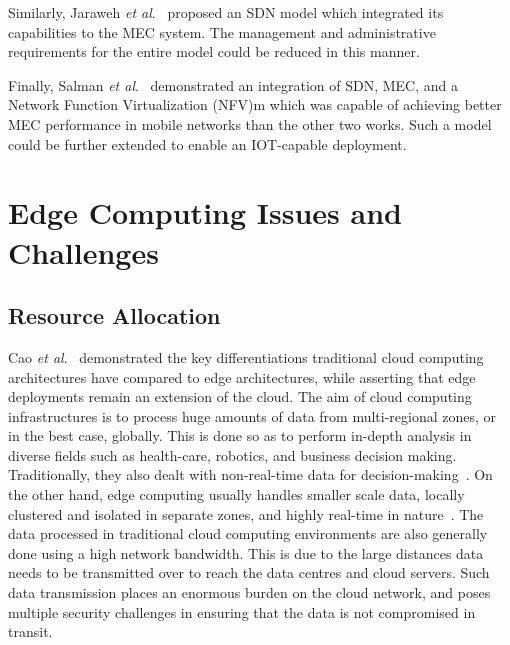 Similarly, Jaraweh \textit{et al}.~\cite{jararweh2016sdmec} proposed an SDN model which integrated its capabilities to the MEC system. The management and administrative requirements for the entire model could be reduced in this manner.\par

Finally, Salman \textit{et al}.~\cite{salman2015edge} demonstrated an integration of SDN, MEC, and a Network Function Virtualization (NFV)m which was capable of achieving better MEC performance in mobile networks than the other two works. Such a model could be further extended to enable an IOT-capable deployment.\par

\section{Edge Computing Issues and Challenges}
\label{sec:ch3-edge-issues}

\subsection{Resource Allocation}
\label{subsec:ch3-edge-resource-alloc}

Cao \textit{et al}.~\cite{cao2020overview} demonstrated the key differentiations traditional cloud computing architectures have compared to edge architectures, while asserting that edge deployments remain an extension of the cloud. The aim of cloud computing infrastructures is to process huge amounts of data from multi-regional zones, or in the best case, globally. This is done so as to perform in-depth analysis in diverse fields such as health-care, robotics, and business decision making. Traditionally, they also dealt with non-real-time data for decision-making~\cite{premsankar2018edge}. On the other hand, edge computing usually handles smaller scale data, locally clustered and isolated in separate zones, and highly real-time in nature~\cite{mishra2020early}. The data processed in traditional cloud computing environments are also generally done using a high network bandwidth. This is due to the large distances data needs to be transmitted over to reach the data centres and cloud servers. Such data transmission places an enormous burden on the cloud network, and poses multiple security challenges in ensuring that the data is not compromised in transit.\par

